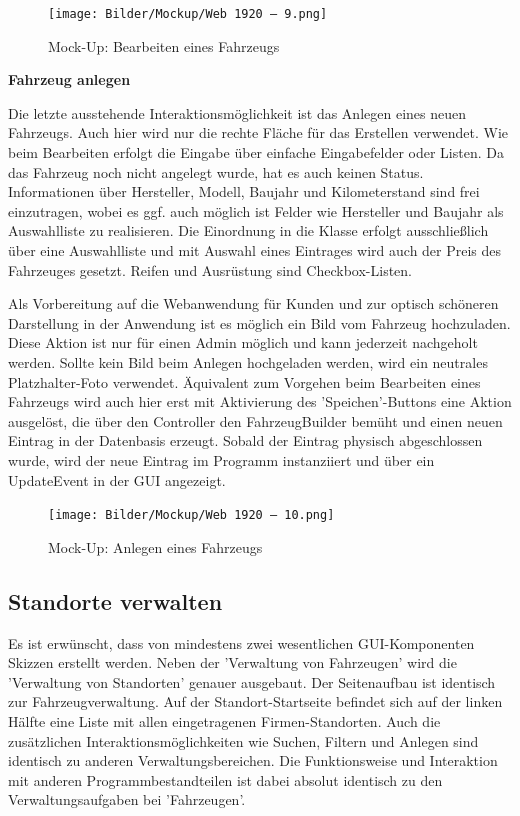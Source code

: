 \begin{figure}[!ht]
    \centering
    \texttt{[image: Bilder/Mockup/Web 1920 – 9.png]}
    \caption{Mock-Up: Bearbeiten eines Fahrzeugs}
    \label{mu:bearbeiten}
\end{figure}

\newpage

\textbf{Fahrzeug anlegen}

Die letzte ausstehende Interaktionsmöglichkeit ist das Anlegen eines neuen Fahrzeugs. 
Auch hier wird nur die rechte Fläche für das Erstellen verwendet. Wie beim Bearbeiten erfolgt die Eingabe über einfache Eingabefelder oder Listen. 
Da das Fahrzeug noch nicht angelegt wurde, hat es auch keinen Status. 
Informationen über Hersteller, Modell, Baujahr und Kilometerstand sind frei einzutragen, wobei es ggf. auch möglich ist Felder wie Hersteller und Baujahr als Auswahlliste zu realisieren. 
Die Einordnung in die Klasse erfolgt ausschließlich über eine Auswahlliste und mit Auswahl eines Eintrages wird auch der Preis des Fahrzeuges gesetzt. Reifen und Ausrüstung sind Checkbox-Listen. 

Als Vorbereitung auf die Webanwendung für Kunden und zur optisch schöneren Darstellung in der Anwendung ist es möglich ein Bild vom Fahrzeug hochzuladen. 
Diese Aktion ist nur für einen Admin möglich und kann jederzeit nachgeholt werden. 
Sollte kein Bild beim Anlegen hochgeladen werden, wird ein neutrales Platzhalter-Foto verwendet.
Äquivalent zum Vorgehen beim Bearbeiten eines Fahrzeugs wird auch hier erst mit Aktivierung des 'Speichen'-Buttons eine Aktion ausgelöst, die über den Controller den FahrzeugBuilder bemüht und einen neuen Eintrag in der Datenbasis erzeugt. 
Sobald der Eintrag physisch abgeschlossen wurde, wird der neue Eintrag im Programm instanziiert und über ein UpdateEvent in der GUI angezeigt.  

\begin{figure}[!ht]
    \centering
    \texttt{[image: Bilder/Mockup/Web 1920 – 10.png]}
    \caption{Mock-Up: Anlegen eines Fahrzeugs}
    \label{mu:anlegen}
\end{figure}

\newpage

\subsection{Standorte verwalten}

Es ist erwünscht, dass von mindestens zwei wesentlichen GUI-Komponenten Skizzen erstellt werden. 
Neben der 'Verwaltung von Fahrzeugen' wird die 'Verwaltung von Standorten' genauer ausgebaut. 
Der Seitenaufbau ist identisch zur Fahrzeugverwaltung. 
Auf der Standort-Startseite befindet sich auf der linken Hälfte eine Liste mit allen eingetragenen Firmen-Standorten. 
Auch die zusätzlichen Interaktionsmöglichkeiten wie Suchen, Filtern und Anlegen sind identisch zu anderen Verwaltungsbereichen. 
Die Funktionsweise und Interaktion mit anderen Programmbestandteilen ist dabei absolut identisch zu den Verwaltungsaufgaben bei 'Fahrzeugen'.


